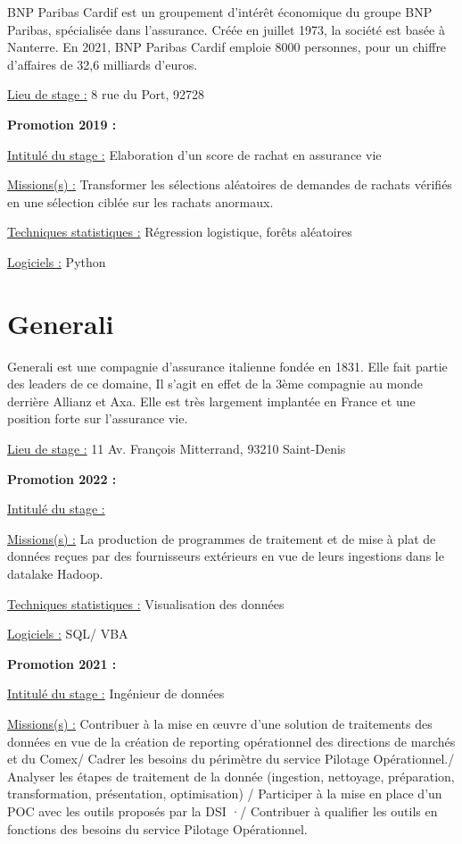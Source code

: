 \documentclass[
  letterpaper,
  DIV=11,
  numbers=noendperiod]{scrreprt}
\begin{document}
BNP Paribas Cardif est un groupement d'intérêt économique du groupe BNP
Paribas, spécialisée dans l'assurance. Créée en juillet 1973, la société
est basée à Nanterre. En 2021, BNP Paribas Cardif emploie 8000
personnes, pour un chiffre d'affaires de 32,6 milliards d'euros.

\uline{Lieu de stage :} 8 rue du Port, 92728

\textbf{Promotion 2019 :}

\uline{Intitulé du stage :} Elaboration d'un score de rachat en
assurance vie

\uline{Missions(s) :} Transformer les sélections aléatoires de demandes
de rachats vérifiés en une sélection ciblée sur les rachats anormaux.

\uline{Techniques statistiques :} Régression logistique, forêts
aléatoires

\uline{Logiciels :} Python

\hypertarget{generali}{%
\section{\texorpdfstring{\textbf{Generali}}{Generali}}\label{generali}}

Generali est une compagnie d'assurance italienne fondée en 1831. Elle
fait partie des leaders de ce domaine, Il s'agit en effet de la 3ème
compagnie au monde derrière Allianz et Axa. Elle est très largement
implantée en France et une position forte sur l'assurance vie.

\uline{Lieu de stage :} 11 Av. François Mitterrand, 93210 Saint-Denis

\textbf{Promotion 2022 :}

\uline{Intitulé du stage :}

\uline{Missions(s) :} La production de programmes de traitement et de
mise à plat de données reçues par des fournisseurs extérieurs en vue de
leurs ingestions dans le datalake Hadoop.

\uline{Techniques statistiques :} Visualisation des données

\uline{Logiciels :} SQL/ VBA

\textbf{Promotion 2021 :}

\uline{Intitulé du stage :} Ingénieur de données

\uline{Missions(s) :} Contribuer à la mise en œuvre d'une solution de
traitements des données en vue de la création de reporting opérationnel
des directions de marchés et du Comex/ Cadrer les besoins du périmètre
du service Pilotage Opérationnel./ Analyser les étapes de traitement de
la donnée (ingestion, nettoyage, préparation, transformation,
présentation, optimisation) / Participer à la mise en place d'un POC
avec les outils proposés par la DSI ·/ Contribuer à qualifier les outils
en fonctions des besoins du service Pilotage Opérationnel.
\end{document}
